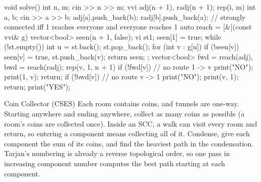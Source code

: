 \begin{code}
void solve() {
    int n, m;
    cin >> n >> m;
    vvi adj(n + 1), radj(n + 1);
    rep(i, m) {
        int a, b;
        cin >> a >> b;
        adj[a].push_back(b);
        radj[b].push_back(a);
    }
    // strongly connected iff 1 reaches everyone and everyone reaches 1
    auto reach = [&](const vvi& g) {
        vector<bool> seen(n + 1, false);
        vi st{1};
        seen[1] = true;
        while (!st.empty()) {
            int u = st.back();
            st.pop_back();
            for (int v : g[u])
                if (!seen[v]) seen[v] = true, st.push_back(v);
        }
        return seen;
    };
    vector<bool> fwd = reach(adj), bwd = reach(radj);
    rep(v, 1, n + 1) {
        if (!fwd[v]) {  // no route 1 -> v
            print("NO");
            print(1, v);
            return;
        }
        if (!bwd[v]) {  // no route v -> 1
            print("NO");
            print(v, 1);
            return;
        }
    }
    print("YES");
}
\end{code}

\begin{problem}{Coin Collector (CSES)}
Each room contains coins, and tunnels are one-way. Starting anywhere and ending anywhere, collect as many coins as possible (a
room's coins are collected once).
\solution Inside an SCC, a walk can visit every room and return, so entering a component means collecting all of it. Condense,
give each component the sum of its coins, and find the heaviest path in the condensation. Tarjan's numbering is already a reverse
topological order, so one pass in increasing component number computes the best path starting at each component.
\end{problem}

